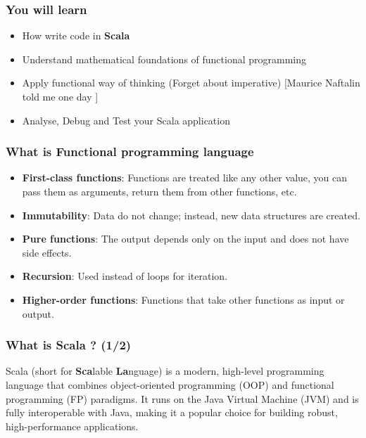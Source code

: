 \documentclass{beamer}
\begin{document}
\begin{frame}
\frametitle{You will learn }

\begin{itemize}
    \item How write code in \textbf{Scala} 
    \item Understand mathematical foundations of functional programming
    \item Apply functional way of thinking (Forget about imperative) [Maurice Naftalin told me one day ]
    \item Analyse, Debug and Test your Scala application
\end{itemize}            
\end{frame}



\begin{frame}
\frametitle{What is Functional programming language}

\begin{itemize}
    \item \textbf{First-class functions}: Functions are treated like any other value, you can pass them as arguments, return them from other functions, etc.
    \item \textbf{Immutability}: Data do not change; instead, new data structures are created.
    \item \textbf{Pure functions}: The output depends only on the input and does not have side effects.
    \item \textbf{Recursion}: Used instead of loops for iteration.
    \item \textbf{Higher-order functions}: Functions that take other functions as input or output.
\end{itemize}
\end{frame}



\begin{frame}
\frametitle{What is Scala ? (1/2) }

Scala (short for \textbf{Sca}lable \textbf{La}nguage) is a modern, high-level programming language that combines object-oriented programming (OOP) and functional programming (FP) paradigms. It runs on the Java Virtual Machine (JVM) and is fully interoperable with Java, making it a popular choice for building robust, high-performance applications.

\end{frame}
\end{document}
